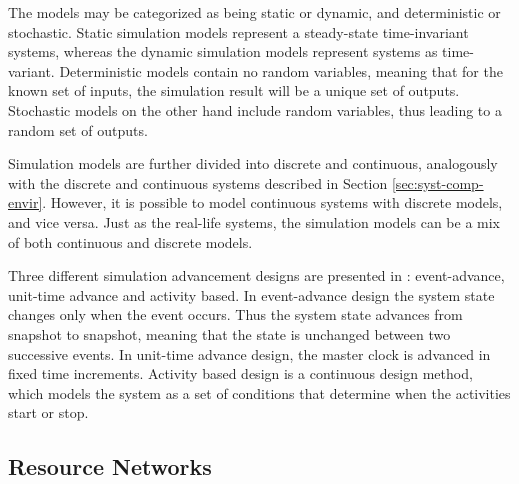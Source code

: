 The models may be categorized as being static or dynamic, and deterministic or stochastic. Static simulation models represent a steady-state time-invariant systems, whereas the dynamic simulation models represent systems as time-variant. Deterministic models contain no random variables, meaning that for the known set of inputs, the simulation result will be a unique set of outputs. Stochastic models on the other hand include random variables, thus leading to a random set of outputs. \cite{Banks:2010:DES}

Simulation models are further divided into discrete and continuous, analogously with the discrete and continuous systems described in Section \ref{sec:syst-comp-envir}. However, it is possible to model continuous systems with discrete models, and vice versa. Just as the real-life systems, the simulation models can be a mix of both continuous and discrete models.  \cite{Banks:2010:DES}

Three different simulation advancement designs are presented in \cite{PEROS}: event-advance, unit-time advance and activity based. In event-advance design the system state changes only when the event occurs. Thus the system state advances from snapshot to snapshot, meaning that the state is unchanged between two successive events. In unit-time advance design, the master clock is advanced in fixed time increments. Activity based design is a continuous design method, which models the system as a set of conditions that determine when the activities start or stop. \cite{PEROS}

\subsection{Resource Networks}
\label{sec:resource-networks}






